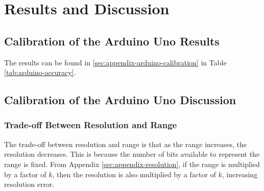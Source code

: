 \section{Results and Discussion}

\subsection{Calibration of the Arduino Uno Results}
The results can be found in \ref{sec:appendix-arduino-calibration} in Table \ref{tab:arduino-accuracy}.
\subsection{Calibration of the Arduino Uno Discussion}
\subsubsection{Trade-off Between Resolution and Range}
The trade-off between resolution and range is that as the range increases, the resolution decreases. This is because the number of bits
available to represent the range is fixed. From Appendix \ref{sec:appendix-resolution}, if the range is multiplied by a factor of $k$, then the resolution is also multiplied by a factor of $k$, increasing resolution error.

